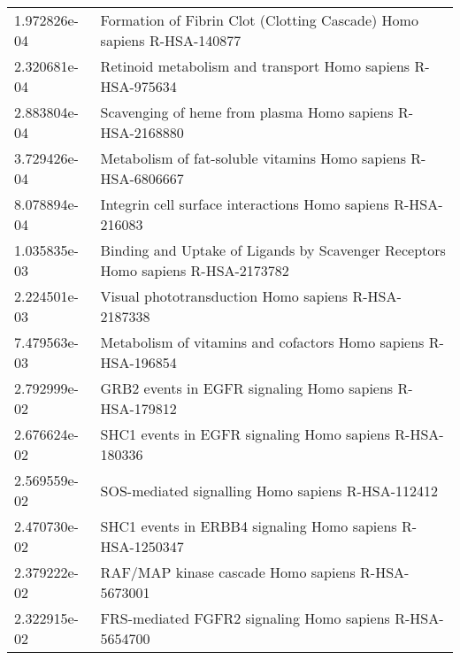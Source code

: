 \begin{longtable}{p{2.4cm}p{14.5cm}}
             1.972826e-04 &                                                     Formation of Fibrin Clot (Clotting Cascade) Homo sapiens R-HSA-140877 \\
             2.320681e-04 &                                                               Retinoid metabolism and transport Homo sapiens R-HSA-975634 \\
             2.883804e-04 &                                                                 Scavenging of heme from plasma Homo sapiens R-HSA-2168880 \\
             3.729426e-04 &                                                             Metabolism of fat-soluble vitamins Homo sapiens R-HSA-6806667 \\
             8.078894e-04 &                                                              Integrin cell surface interactions Homo sapiens R-HSA-216083 \\
             1.035835e-03 &                                           Binding and Uptake of Ligands by Scavenger Receptors Homo sapiens R-HSA-2173782 \\
             2.224501e-03 &                                                                       Visual phototransduction Homo sapiens R-HSA-2187338 \\
             7.479563e-03 &                                                            Metabolism of vitamins and cofactors Homo sapiens R-HSA-196854 \\
             2.792999e-02 &                                                                   GRB2 events in EGFR signaling Homo sapiens R-HSA-179812 \\
             2.676624e-02 &                                                                   SHC1 events in EGFR signaling Homo sapiens R-HSA-180336 \\
             2.569559e-02 &                                                                         SOS-mediated signalling Homo sapiens R-HSA-112412 \\
             2.470730e-02 &                                                                 SHC1 events in ERBB4 signaling Homo sapiens R-HSA-1250347 \\
             2.379222e-02 &                                                                         RAF/MAP kinase cascade Homo sapiens R-HSA-5673001 \\
             2.322915e-02 &                                                                   FRS-mediated FGFR2 signaling Homo sapiens R-HSA-5654700 \\

\end{longtable}
